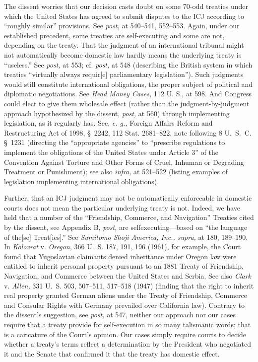{  The dissent worries that our decision casts doubt on some 70-odd
treaties under which the United States has agreed to submit disputes
to the ICJ according to ``roughly similar'' provisions. See
\emph{post,} at 540--541, 552--553. Again, under our established
precedent, some treaties are self-executing and some are not, depending
on the treaty. That the judgment of an international tribunal might
not automatically become domestic law hardly means the underlying
treaty is ``useless.'' See \emph{post,} at 553; cf. \emph{post,} at 548
(describing the British system in which treaties ``virtually always
requir[e] parliamentary legislation''). Such judgments would still
constitute international obligations, the proper subject of political
and diplomatic negotiations. See \emph{Head Money Cases,} 112 U. S., at
598. And Congress could elect to give them wholesale effect (rather
than the judgment-by-judgment approach hypothesized by the dissent,
\emph{post,} at 560) through implementing legislation, as it regularly
has. See, \emph{e. g.,} Foreign Affairs Reform and Restructuring Act
of 1998, \S~2242, 112 Stat. 2681--822, note following 8 U.~S.~C.
\S~1231 (directing the ``appropriate agencies'' to ``prescribe
regulations to implement the obligations of the United States under
Article 3'' of the Convention Against Torture and Other Forms of Cruel,
Inhuman or Degrading Treatment or Punishment); see also \emph{infra,} at
521--522 (listing examples of legislation implementing international
obligations).

  Further, that an ICJ judgment may not be automatically enforceable
in domestic courts does not mean the particular \newpage  underlying
treaty is not. Indeed, we have held that a number of the ``Friendship,
Commerce, and Navigation'' Treaties cited by the dissent, see
Appendix B, \emph{post,} are selfexecuting---based on ``the language of
the[se] Treat[ies].'' See \emph{Sumitomo Shoji America, Inc., supra,} at
180, 189--190. In \emph{Kolovrat} v. \emph{Oregon,} 366 U.~S. 187, 191,
196 (1961), for example, the Court found that Yugoslavian claimants
denied inheritance under Oregon law were entitled to inherit personal
property pursuant to an 1881 Treaty of Friendship, Navigation, and
Commerce between the United States and Serbia. See also \emph{Clark} v.
\emph{Allen,} 331 U.~S. 503, 507--511, 517--518 (1947) (finding that the
right to inherit real property granted German aliens under the Treaty
of Friendship, Commerce and Consular Rights with Germany prevailed
over California law). Contrary to the dissent's suggestion, see
\emph{post,} at 547, neither our approach nor our cases require that a
treaty provide for self-execution in so many talismanic words; that is
a caricature of the Court's opinion. Our cases simply require courts
to decide whether a treaty's terms reflect a determination by the
President who negotiated it and the Senate that confirmed it that the
treaty has domestic effect.

}
